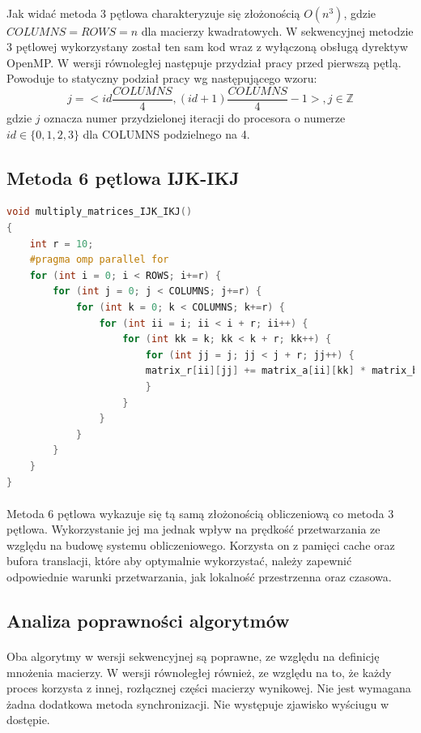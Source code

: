 \documentclass{scrartcl}
\begin{document}
\paragraph{}Jak widać metoda 3 pętlowa charakteryzuje się złożonością $O(n^3)$, gdzie $COLUMNS = ROWS = n$ dla macierzy kwadratowych. W sekwencyjnej metodzie 3 pętlowej wykorzystany został ten sam kod wraz z wyłączoną obsługą dyrektyw OpenMP. W wersji równoległej następuje przydział pracy przed pierwszą pętlą. Powoduje to statyczny podział pracy wg następującego wzoru:
\begin{equation}
j = <id \frac{COLUMNS}{4}, (id + 1)\frac{COLUMNS}{4} - 1>,
j \in \mathbb{Z}
\end{equation}
gdzie $j$ oznacza numer przydzielonej iteracji do procesora o numerze $id \in \{0, 1, 2, 3\}$ dla COLUMNS podzielnego na 4.
\subsection{Metoda 6 pętlowa IJK-IKJ}
\begin{lstlisting}[language=C++, caption={Metoda sześciopętlowa}]
void multiply_matrices_IJK_IKJ()
{
	int r = 10;
	#pragma omp parallel for
	for (int i = 0; i < ROWS; i+=r) {
		for (int j = 0; j < COLUMNS; j+=r) {
			for (int k = 0; k < COLUMNS; k+=r) {
				for (int ii = i; ii < i + r; ii++) {
					for (int kk = k; kk < k + r; kk++) {
						for (int jj = j; jj < j + r; jj++) {
						matrix_r[ii][jj] += matrix_a[ii][kk] * matrix_b[kk][jj];
						}
					}
				}
			}
		}
	}
}
\end{lstlisting}
\paragraph{}Metoda 6 pętlowa wykazuje się tą samą złożonością obliczeniową co metoda 3 pętlowa. Wykorzystanie jej ma jednak wpływ na prędkość przetwarzania ze względu na budowę systemu obliczeniowego. Korzysta on z pamięci cache oraz bufora translacji, które aby optymalnie wykorzystać, należy zapewnić odpowiednie warunki przetwarzania, jak lokalność przestrzenna oraz czasowa.
\subsection{Analiza poprawności algorytmów}
\paragraph{}Oba algorytmy w wersji sekwencyjnej są poprawne, ze względu na definicję mnożenia macierzy. W wersji równoległej również, ze względu na to, że każdy proces korzysta z innej, rozłącznej części macierzy wynikowej. Nie jest wymagana żadna dodatkowa metoda synchronizacji. Nie występuje zjawisko wyściugu w dostępie.
\end{document}
